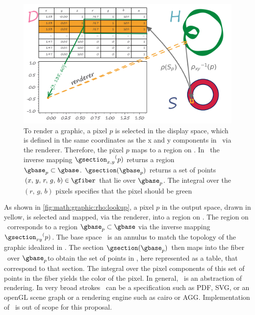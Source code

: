 \documentclass[../main.tex]{subfiles}
\begin{document}
\begin{figure}[H]
    \includegraphics[width=\textwidth]{figures/math/render.png}
    \caption{To render a graphic, a pixel \(p\) is selected in the display space, which is defined in the same coordinates as the x and y components in \gfiber\ via the renderer. Therefore, the pixel \(p\) maps to a region on \gtotal. In \gtotal\, the inverse mapping \({\gsection_{x,y}}^(p)\) returns a region \(\gbase_{p} \subset \gbase\). \(\gsection(\gbase_{p})\) returns a set of points \((x,\,y,\,r,\,g,\,b) \in \gfiber\) that lie over \(\gbase_{p}\). The integral over the \((r,\,g,\,b)\) pixels specifies that the pixel should be green}
    \label{fig:math:graphic:rho:lookup}
\end{figure}

As shown in \autoref{fig:math:graphic:rho:lookup}, a pixel \(p\) in the output space, drawn in yellow, is selected and mapped, via the renderer, into a region on \gtotal.  The region on \gtotal\ corresponds to a region \(\gbase_p \subset \gbase\) via the inverse mapping  \({\gsection_{xy}}^(p)\). The base space \gbase\ is an annulus to match the topology of the graphic idealized in \gtotal. The section  \(\gsection(\gbase_{p})\) then maps into the fiber \gfiber\ over \(\gbase_p\)to obtain the set of points in \gfiber, here represented as a table, that correspond to that section. The integral over the pixel components of this set of points in the fiber yields the color of the pixel. In general, \gsection\ is an abstraction of rendering. In very broad strokes \gsection\ can be a specification such as PDF\cite{bienz1993portable}, SVG\cite{quintScalable2003}, or an openGL scene graph\cite{CarsonOpenGL1997} or a rendering engine such as cairo\cite{CairographicsOrg} or AGG\cite{shemanarevAntiGrainGeometry}. Implementation of \gsection\ is out of scope for this proposal. 
\end{document}
